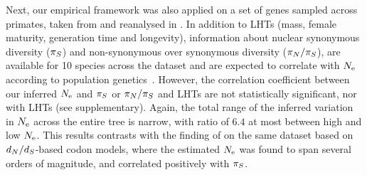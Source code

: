\documentclass{article}
\begin{document}

Next, our empirical framework was also applied on a set of genes sampled across primates, taken from \citet{Perelman2011} and reanalysed in \citet{Brevet2019}.
In addition to LHTs (mass, female maturity, generation time and longevity), information about nuclear {synonymous} diversity ($\pi_S$) and {non-synonymous} over {synonymous} diversity ($\pi_N / \pi_S$), are available for 10 species across the dataset and are expected to correlate with $N_{\text{e}}$ according to population genetics~\citep{Eyre-walker2007, Galtier2016}.
However, the correlation coefficient between our inferred $N_{\text{e}}$ and $\pi_S$ or $\pi_N / \pi_S$ and LHTs are not statistically significant, nor with {LHT}s (see supplementary).
Again, the total range of the inferred variation in $N_{\text{e}}$ across the entire tree is narrow, with ratio of $6.4$ at most between high and low $N_{\text{e}}$.
This results contrasts with the finding of \citet{Brevet2019} on the same dataset based on $d_N / d_S$-based {codon} models, where the estimated $N_{\text{e}}$ was found to span several orders of magnitude, and correlated positively with $\pi_S$.
\end{document}
